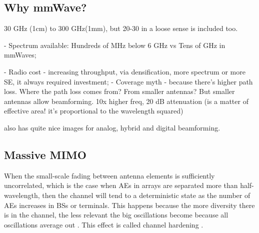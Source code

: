 \subsection{Why mmWave?}

30 GHz (1cm) to 300 GHz(1mm), but 20-30 in a loose sense is included too.

- Spectrum available: Hundreds of MHz below 6 GHz vs Tens of GHz in mmWaves;

- Radio cost - increasing throughput, via densification, more spectrum or more SE, it always required investment;
- Coverage myth - because there's higher path loss. Where the path loss comes from? From smaller antennas? But smaller antennas allow beamforming. 10x higher freq, 20 dB attenuation (is a matter of effective area! it's proportional to the wavelength squared)

\cite{phdthesis} also has quite nice images for analog, hybrid and digital beamforming.



\subsection{Massive MIMO}







When the small-scale fading between antenna elements is sufficiently uncorrelated, which is the case when AEs in arrays are separated more than half-wavelength, then the channel will tend to a deterministic state as the number of AEs increases in BSs or terminals. This happens because the more diversity there is in the channel, the less relevant the big oscillations become because all oscillations average out . This effect is called channel hardening \cite{1327795}.

